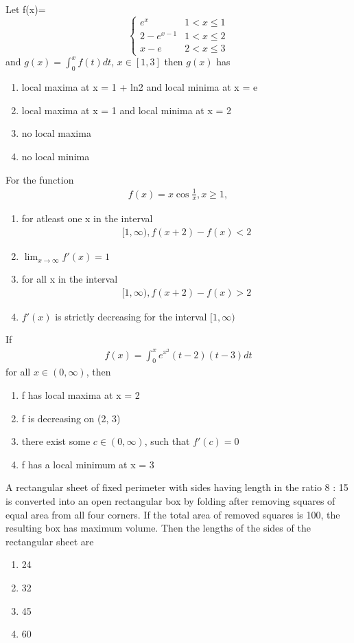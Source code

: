 \item Let 
f(x)=
\[ \begin{cases} 
      e^x &  1 < x \leq 1\\
      2 - e^{x - 1} & 1 < x \leq 2\\
      x - e & 2 < x \leq 3
   \end{cases}
\] 
and 
$g(x) = \int_{0}^{x}f(t)dt$, $x \in [1, 3]$ then $g(x)$ has 
\begin{enumerate}
\item local maxima at x = 1 + ln2 and local minima at x = e
\item local maxima at x = 1 and local minima at x = 2
\item no local maxima
\item no local minima
\end{enumerate}

\item For the function 
\begin{align*} 
f(x) = x \cos \frac{1}{x}, x \geq 1,
\end{align*}
\begin{enumerate}
\item for atleast one x in the interval 
\begin{align*}
[1, \infty), f(x + 2) - f(x) < 2
\end{align*}
\item $\lim_{x \to \infty} f'(x) = 1$
\item for all x in the interval 
\begin{align*}
[1, \infty), f(x + 2) - f(x) > 2
\end{align*}
\item $f'(x)$ is strictly decreasing for the interval $[1, \infty)$
\end{enumerate}

\item If 
\begin{align*}
f(x) = \int_{0}^{x} e^{x^2}(t - 2)(t - 3)dt
\end{align*} 
for all $x \in  (0, \infty)$, then 
\begin{enumerate}
\item f has local maxima at x = 2
\item f is decreasing on (2, 3)
\item there exist some $c \in (0, \infty)$, such that $f'(c) = 0$
\item f has a local minimum at x = 3
\end{enumerate}

\item A rectangular sheet of fixed perimeter with sides having length in the ratio 8 : 15 is converted into an open rectangular box by folding after removing squares of equal area from all four corners. If the total area of removed squares is 100, the resulting box has maximum volume. Then the lengths of the sides of the rectangular sheet are
\begin{enumerate}
\item 24
\item 32
\item 45
\item 60
\end{enumerate}

